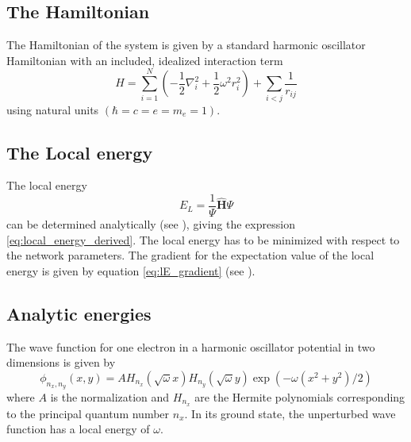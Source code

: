 \documentclass[11pt,a4paper,titlepage]{article}
\begin{document}
\subsection{The Hamiltonian}
The Hamiltonian of the system is given by a standard harmonic oscillator Hamiltonian with an included, idealized interaction term
\begin{equation}\label{eq:hamiltonian}
\hat{H}=\sum_{i=1}^{N}\left(-\frac{1}{2} \nabla_{i}^{2}+\frac{1}{2} \omega^{2} r_{i}^{2}\right)+\sum_{i<j} \frac{1}{r_{i j}}
\end{equation}
using natural units $\left(\hbar=c=e=m_{e}=1\right)$.
\subsection{The Local energy }
The local energy
\begin{equation}
E_{L}=\frac{1}{\Psi} \hat{\mathbf{H}} \Psi
\end{equation}
can be determined analytically (see ), giving the expression \eqref{eq:local_energy_derived}. The local energy has to be minimized with respect to the network parameters. The gradient for the expectation value of the local energy is given by equation \eqref{eq:lE_gradient} (see ).
\subsection{Analytic energies}\label{section: Analytic_energies}
The wave function for one electron in a harmonic oscillator potential in two dimensions is given by
\begin{equation}
\phi_{n_{x}, n_{y}}(x, y)=A H_{n_{x}}(\sqrt{\omega} x) H_{n_{y}}(\sqrt{\omega} y) \exp \left(-\omega\left(x^{2}+y^{2}\right) / 2\right)
\end{equation}
where $A$ is the normalization and $H_{n_{x}}$ are the Hermite polynomials corresponding to the principal quantum number $n_{x}$. In its ground state, the unperturbed wave function has a local energy of $\omega$. 
\end{document}
